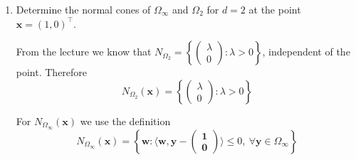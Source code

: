 \documentclass{article}
\newcommand{\norm}[1]{\left\lVert#1\right\rVert}
\newcommand{\twovector}[2]{\begin{pmatrix} #1 \\ #2 \end{pmatrix}}
\newcommand{\vect}[1]{\mathbf{#1}}
\newcommand{\set}[1]{\left\{ #1 \right\}}
\begin{document}
{\begin{enumerate}
\underline{Closed}: Let $\Omega^c= \mathbb{R}^d\setminus\Omega$. To show that $\Omega$ is closed we show that
$\Omega^c$ is open. To show that a set is open we must show that for every element in the set there exists an open ball that is completely contained in the set. Let $\vect{x}\in\Omega^c$, this implies $\norm{\vect{x}}>1$. Let $\epsilon = \norm{\vect{x}} -1$ and define the open ball $B(\vect{x},\epsilon)$ with center $\vect{x}$ and radius $\epsilon$. Let $\vect{y}\in B(\vect{x},\epsilon)$. Then by the definition of an open ball we have
$\norm{\vect{x-y}}_2<\epsilon$ (here I use the euclidean norm because I assume that we want to show that
$\Omega_\infty,\Omega_2$ are both open in $(\mathbb{R}^d,\norm{\cdot}_2$). Now we show that $\vect{y}\in \Omega^c$. First, by the triangle inequality
\begin{align*}
\norm{\vect{x}} = \norm{\vect{x-y+y}} \leq \norm{\vect{y}} + \norm{\vect{x-y}}.
\end{align*}
From this we get
\begin{align*}
\norm{\vect{y}} &\geq \norm{\vect{x}} - \norm{\vect{x-y}}\\
                &\overset{(*)}{\geq} \norm{\vect{x}} - \norm{\vect{x-y}}_2\\
                &> 1 + \epsilon - \epsilon \\
                &=1.
\end{align*}
$(*)$ This inequality is trivial if $\norm{\cdot} = \norm{\cdot}_2$, but if $\norm{\cdot}=\norm{\cdot}_\infty$ we use the result that $\norm{\vect{x}}_\infty\leq\norm{\vect{x}}_2\, \forall \vect{x}\in\mathbb{R}^d$.
This shows that for every $\vect{x}\in\Omega^c$ there exists an $\epsilon > 0$ such that the open ball centered at $\vect{x}$ with radius $\epsilon$ is contained in $\Omega^c$. Therefore $\Omega^c$ is an open set and hence $\Omega$ is a closed set.


\item Determine the normal cones of $\Omega_\infty$ and $\Omega_2$ for $d=2$ at the point $\vect{x} = (1,0)^\top$.

From the lecture we know that $N_{\Omega_2} = \set{\twovector{\lambda}{0}: \lambda >0}$, independent of the point.
Therefore
\begin{equation*}
N_{\Omega_2}(\vect{x}) = \set{\twovector{\lambda}{0}: \lambda >0}
\end{equation*}

For $N_{\Omega_\infty}(\vect{x})$ we use the definition
\begin{equation*}
N_{\Omega_\infty}(\vect{x}) = \set{\vect{w} : \langle\vect{w},\vect{y-\twovector{1}{0}}\rangle\leq 0,\ \forall\vect{y}\in\Omega_\infty}
\end{equation*}


\end{enumerate}}
\end{document}
